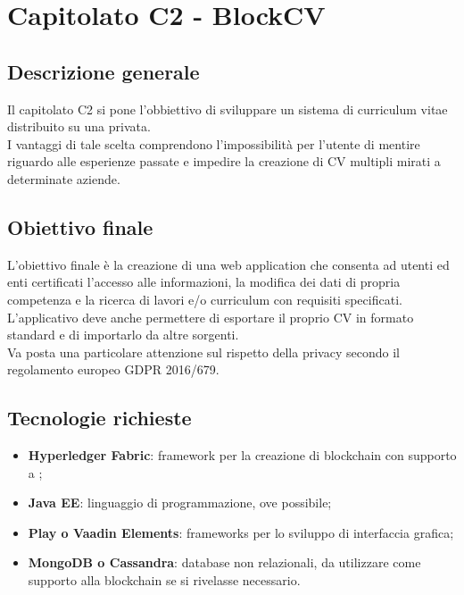 \documentclass[StudioDiFattibilità.tex]{subfiles}
\begin{document}
\chapter{Capitolato C2 - BlockCV}
\section{Descrizione generale}
Il capitolato C2 si pone l'obbiettivo di sviluppare un sistema di curriculum vitae distribuito su una  privata.\\
I vantaggi di tale scelta comprendono l'impossibilità per l'utente di mentire riguardo alle esperienze passate e impedire la creazione di CV multipli mirati a determinate aziende.
\section{Obiettivo finale}
L'obiettivo finale è la creazione di una web application che consenta ad utenti ed enti certificati l'accesso alle informazioni, la modifica dei dati di propria competenza e la ricerca di lavori e/o curriculum con requisiti specificati.\\
L'applicativo deve anche permettere di esportare il proprio CV in formato standard e di importarlo da altre sorgenti.\\
Va posta una particolare attenzione sul rispetto della privacy secondo il regolamento europeo GDPR 2016/679.
\section{Tecnologie richieste}
\begin{itemize}
	\item \textbf{Hyperledger Fabric}: framework per la creazione di blockchain con supporto a ;
	\item \textbf{Java EE}: linguaggio di programmazione, ove possibile;
	\item \textbf{Play o Vaadin Elements}: frameworks per lo sviluppo di interfaccia grafica;
	\item \textbf{MongoDB o Cassandra}: database non relazionali, da utilizzare come supporto alla blockchain se si rivelasse necessario.
\end{itemize}
\end{document}
